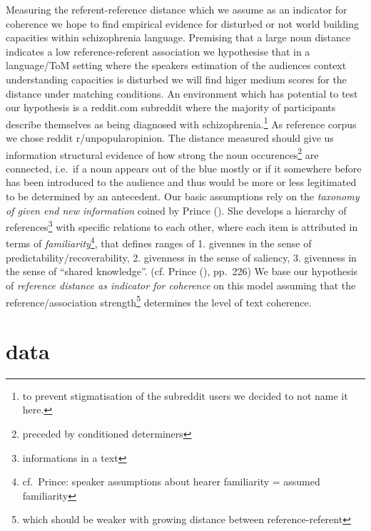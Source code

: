 \documentclass[
  12pt,
  oneside]{book}
\begin{document}
Measuring the referent-reference distance which we assume as an indicator for coherence we hope to find empirical evidence for disturbed or not world building capacities within schizophrenia language. Premising that a large noun distance indicates a low reference-referent association we hypothesise that in a language/ToM setting where the speakers estimation of the audiences context understanding capacities is disturbed we will find higer medium scores for the distance under matching conditions. An environment which has potential to test our hypothesis is a reddit.com subreddit where the majority of participants describe themselves as being diagnosed with schizophrenia.\footnote{to prevent stigmatisation of the subreddit users we decided to not name it here.} As reference corpus we chose reddit r/unpopularopinion.
The distance measured should give us information structural evidence of how strong the noun occurences\footnote{preceded by conditioned determiners} are connected, i.e.~if a noun appears out of the blue mostly or if it somewhere before has been introduced to the audience and thus would be more or less legitimated to be determined by an antecedent.
Our basic assumptions rely on the \emph{taxonomy of given end new information} coined by Prince (). She develops a hierarchy of references\footnote{informations in a text} with specific relations to each other, where each item is attributed in terms of \emph{familiarity}\footnote{cf.~Prince: speaker assumptions about hearer familiarity = assumed familiarity}, that defines ranges of 1. givennes in the sense of predictability/recoverability, 2. givenness in the sense of saliency, 3. givenness in the sense of ``shared knowledge''. (cf. Prince (), pp.~226) We base our hypothesis of \emph{reference distance as indicator for coherence} on this model assuming that the reference/association strength\footnote{which should be weaker with growing distance between reference-referent} determines the level of text coherence.

\section{data}\label{data}
\end{document}
